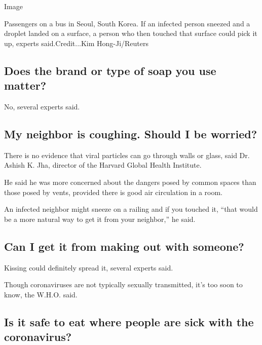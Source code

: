 Image

Passengers on a bus in Seoul, South Korea. If an infected person sneezed
and a droplet landed on a surface, a person who then touched that
surface could pick it up, experts said.Credit...Kim Hong-Ji/Reuters

\hypertarget{does-the-brand-or-type-of-soap-you-use-matter}{%
\subsection{Does the brand or type of soap you use
matter?}\label{does-the-brand-or-type-of-soap-you-use-matter}}

No, several experts said.

\hypertarget{my-neighbor-is-coughing-should-i-be-worried}{%
\subsection{My neighbor is coughing. Should I be
worried?}\label{my-neighbor-is-coughing-should-i-be-worried}}

There is no evidence that viral particles can go through walls or glass,
said Dr. Ashish K. Jha, director of the Harvard Global Health Institute.

He said he was more concerned about the dangers posed by common spaces
than those posed by vents, provided there is good air circulation in a
room.

An infected neighbor might sneeze on a railing and if you touched it,
``that would be a more natural way to get it from your neighbor,'' he
said.

\hypertarget{can-i-get-it-from-making-out-with-someone}{%
\subsection{Can I get it from making out with
someone?}\label{can-i-get-it-from-making-out-with-someone}}

Kissing could definitely spread it, several experts said.

Though coronaviruses are not typically sexually transmitted, it's too
soon to know, the W.H.O. said.

\hypertarget{is-it-safe-to-eat-where-people-are-sick-with-the-coronavirus}{%
\subsection{Is it safe to eat where people are sick with the
coronavirus?}\label{is-it-safe-to-eat-where-people-are-sick-with-the-coronavirus}}

